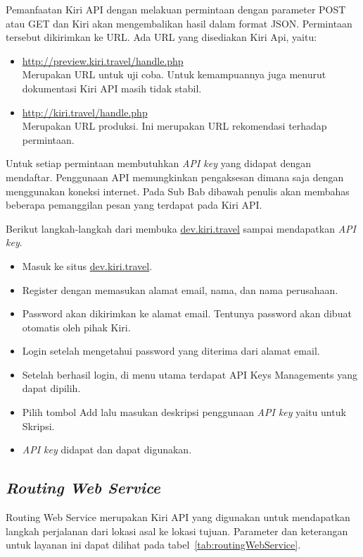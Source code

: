 \hspace{0.5cm} Pemanfaatan Kiri API dengan melakuan permintaan dengan parameter POST atau GET dan Kiri akan mengembalikan hasil dalam format JSON. Permintaan tersebut dikirimkan ke URL. Ada URL yang disediakan Kiri Api, yaitu:
\begin{itemize}
	\item \url{http://preview.kiri.travel/handle.php} \\
	Merupakan URL untuk uji coba. Untuk kemampuannya juga menurut dokumentasi Kiri API masih tidak stabil.
	\item \url{http://kiri.travel/handle.php} \\
	Merupakan URL produksi. Ini merupakan URL rekomendasi terhadap permintaan.
\end{itemize}
Untuk setiap permintaan membutuhkan \textit{API key} yang didapat dengan mendaftar\cite{Kiri}. Penggunaan API memungkinkan pengaksesan dimana saja dengan menggunakan koneksi internet. Pada Sub Bab dibawah penulis akan membahas beberapa pemanggilan pesan yang terdapat pada Kiri API.

Berikut langkah-langkah dari membuka \url{dev.kiri.travel} sampai mendapatkan \textit{API key}.
\begin{itemize}
	\item Masuk ke situs \url{dev.kiri.travel}.
	\item Register dengan memasukan alamat email, nama, dan nama perusahaan.
	\item Password akan dikirimkan ke alamat email. Tentunya password akan dibuat otomatis oleh pihak Kiri.
	\item Login setelah mengetahui password yang diterima dari alamat email. 
	\item Setelah berhasil login, di menu utama terdapat API Keys Managements yang dapat dipilih.
	\item Pilih tombol Add lalu masukan deskripsi penggunaan \textit{API key} yaitu untuk Skripsi.
	\item \textit{API key} didapat dan dapat digunakan.
\end{itemize}

\subsection{\textit{Routing Web Service}}
\label{subsec:Routing Web Service}
\hspace{0.5cm} Routing Web Service merupakan Kiri API yang digunakan untuk mendapatkan langkah perjalanan dari lokasi asal ke lokasi tujuan. Parameter dan keterangan untuk layanan ini dapat dilihat pada tabel~\ref{tab:routingWebService}.

